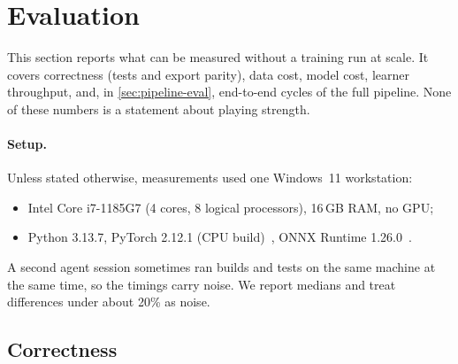 \section{Evaluation}\label{sec:eval}

This section reports what can be measured without a training run at scale. It covers
correctness (tests and export parity), data cost, model cost, learner throughput, and, in
\cref{sec:pipeline-eval}, end-to-end cycles of the full pipeline. None of these numbers is
a statement about playing strength.

\paragraph{Setup.}
Unless stated otherwise, measurements used one Windows~11 workstation:
\begin{itemize}
  \item Intel Core i7-1185G7 (4 cores, 8 logical processors), 16\,GB RAM, no GPU;
  \item Python 3.13.7, PyTorch 2.12.1 (CPU build)~\citep{paszke2019pytorch}, ONNX Runtime
        1.26.0~\citep{onnxruntime2021}.
\end{itemize}
A second agent session sometimes ran builds and tests on the same machine at the same
time, so the timings carry noise. We report medians and treat differences under about
20\% as noise.

\subsection{Correctness}\label{sec:eval-correct}

